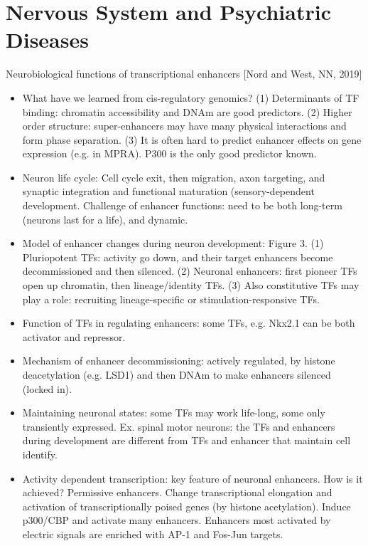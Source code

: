\documentclass{report}
\begin{document}
\section{Nervous System and Psychiatric Diseases}

Neurobiological functions of transcriptional enhancers [Nord and West, NN, 2019]
\begin{itemize}
	\item What have we learned from cis-regulatory genomics? (1) Determinants of TF binding: chromatin accessibility and DNAm are good predictors. (2) Higher order structure: super-enhancers may have many physical interactions and form phase separation. (3) It is often hard to predict enhancer effects on gene expression (e.g. in MPRA). P300 is the only good predictor known.
	
	\item Neuron life cycle: Cell cycle exit, then migration, axon targeting, and synaptic integration and functional maturation (sensory-dependent development. Challenge of enhancer functions: need to be both long-term (neurons last for a life), and dynamic.
	
	\item Model of enhancer changes during neuron development: Figure 3. (1) Pluriopotent TFs: activity go down, and their target enhancers become decommissioned and then silenced. (2) Neuronal enhancers: first pioneer TFs open up chromatin, then lineage/identity TFs. (3) Also constitutive TFs may play a role: recruiting lineage-specific or stimulation-responsive TFs.
	
	\item Function of TFs in regulating enhancers: some TFs, e.g. Nkx2.1 can be both activator and repressor.
	
	\item Mechanism of enhancer decommissioning: actively regulated, by histone deacetylation (e.g. LSD1) and then DNAm to make enhancers silenced (locked in).
	
	\item Maintaining neuronal states: some TFs may work life-long, some only transiently expressed. Ex. spinal motor neurons: the TFs and enhancers during development are different from TFs and enhancer that maintain cell identify.
	
	\item Activity dependent transcription: key feature of neuronal enhancers. How is it achieved? Permissive enhancers. Change transcriptional elongation and activation of transcriptionally poised genes (by histone acetylation). Induce p300/CBP and activate many enhancers. Enhancers most activated by electric signals are enriched with AP-1 and Fos-Jun targets.
	

\end{itemize}
\end{document}
